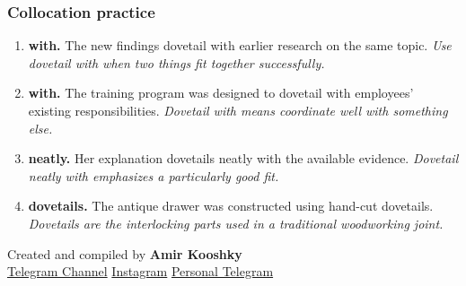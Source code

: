 \documentclass[11pt]{article}
\begin{document}
\subsubsection{Collocation practice}
\begin{enumerate}
  \item \textbf{with.} The new findings dovetail with earlier research on the same topic. \emph{Use dovetail with when two things fit together successfully.}
  \item \textbf{with.} The training program was designed to dovetail with employees' existing responsibilities. \emph{Dovetail with means coordinate well with something else.}
  \item \textbf{neatly.} Her explanation dovetails neatly with the available evidence. \emph{Dovetail neatly with emphasizes a particularly good fit.}
  \item \textbf{dovetails.} The antique drawer was constructed using hand-cut dovetails. \emph{Dovetails are the interlocking parts used in a traditional woodworking joint.}
\end{enumerate}

\vfill
\begin{center}
\small\color{Muted} Created and compiled by \textbf{Amir Kooshky}\\
\href{https://t.me/KooshkyTOEFL}{Telegram Channel}\quad\textbullet\quad
\href{https://www.instagram.com/kooshkytoefl}{Instagram}\quad\textbullet\quad
\href{https://t.me/KooshkyTOEFL\_pv}{Personal Telegram}
\end{center}
\end{document}
